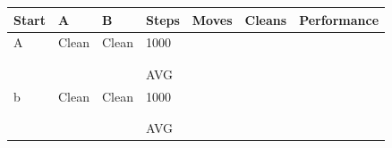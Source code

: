 \begin{longtable}{p{} p{} p{} 
									p{} p{} p{} 
									p{}}
Start	& A & B & Steps & Moves & Cleans & Performance \\\hline
A & Clean & Clean & 1000 
		 &  &  &  \\
	&&&&  &  &  \\
	&&&&  &  &  \\\hline
  &&&  AVG &  &  &  \\\hline
b & Clean & Clean & 1000 
		 &  &  &  \\
	&&&&  &  &  \\
	&&&&  &  &  \\\hline
  &&&  AVG &  &  &  \\\hline
\end{longtable}


